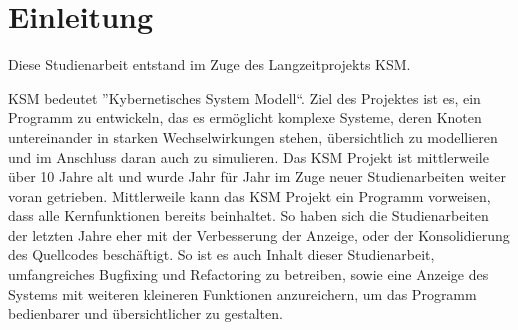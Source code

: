 \section{Einleitung}

Diese Studienarbeit entstand im Zuge des Langzeitprojekts KSM. 

KSM bedeutet ''Kybernetisches System Modell``. Ziel des Projektes ist es, ein Programm zu entwickeln, das es ermöglicht komplexe Systeme, deren Knoten untereinander in starken Wechselwirkungen stehen, übersichtlich zu modellieren und im Anschluss daran auch zu simulieren. Das KSM Projekt ist mittlerweile über 10 Jahre alt und wurde Jahr für Jahr im Zuge neuer Studienarbeiten weiter voran getrieben. Mittlerweile kann das KSM Projekt ein Programm vorweisen, dass alle Kernfunktionen bereits beinhaltet. So haben sich die Studienarbeiten der letzten Jahre eher mit der Verbesserung der Anzeige, oder der Konsolidierung des Quellcodes beschäftigt. So ist es auch Inhalt dieser Studienarbeit, umfangreiches Bugfixing und Refactoring zu betreiben, sowie eine Anzeige des Systems mit weiteren kleineren Funktionen anzureichern, um das Programm bedienbarer und übersichtlicher zu gestalten.
